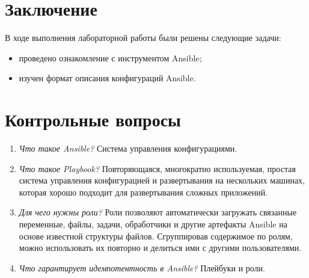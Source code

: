 \section*{Заключение}

В ходе выполнения лабораторной работы были решены следующие задачи:
\begin{itemize}
	\item проведено ознакомление с инструментом Ansible;
	\item изучен формат описания конфигураций Ansible.
\end{itemize}

\section*{Контрольные вопросы}

\begin{enumerate}
	\item \textit{Что такое Ansible?} Система управления конфигурациями.
	\item \textit{Что такое Playbook?} Повторяющаяся, многократно используемая, простая система управления конфигурацией и развертывания на нескольких машинах, которая хорошо подходит для развертывания сложных приложений.
	\item \textit{Для чего нужны роли?} Роли позволяют автоматически загружать связанные переменные, файлы, задачи, обработчики и другие артефакты Ansible на основе известной структуры файлов. Сгруппировав содержимое по ролям, можно использовать их повторно и делиться ими с другими пользователями.
	\item \textit{Что гарантирует идемпотентность в Ansible?} Плейбуки и роли.
\end{enumerate}
